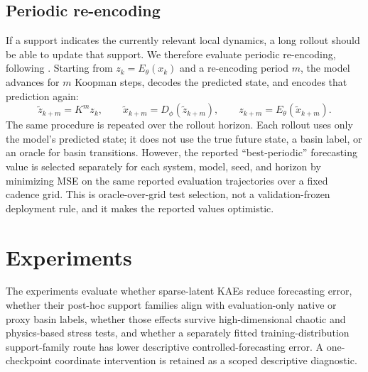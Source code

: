 \documentclass[11pt]{article}
\newcommand{\Enc}{E_\theta}
\newcommand{\Dec}{D_\phi}
\begin{document}
\subsection{Periodic re-encoding}
If a support indicates the currently relevant local dynamics, a long rollout should be able to update that support. We therefore evaluate periodic re-encoding, following \citet{fathi2024course}. Starting from $z_k=\Enc(x_k)$ and a re-encoding period $m$, the model advances for $m$ Koopman steps, decodes the predicted state, and encodes that prediction again:
\begin{equation}
  \tilde z_{k+m}=K^m z_k,\qquad
  \tilde x_{k+m}=\Dec(\tilde z_{k+m}),\qquad
  z_{k+m}=\Enc(\tilde x_{k+m}).
  \label{eq:reencode}
\end{equation}
The same procedure is repeated over the rollout horizon. Each rollout uses only the model's predicted state; it does not use the true future state, a basin label, or an oracle for basin transitions. However, the reported ``best-periodic'' forecasting value is selected separately for each system, model, seed, and horizon by minimizing MSE on the same reported evaluation trajectories over a fixed cadence grid. This is oracle-over-grid test selection, not a validation-frozen deployment rule, and it makes the reported values optimistic.

\section{Experiments}
\label{sec:experiments}
The experiments evaluate whether sparse-latent KAEs reduce forecasting error, whether their post-hoc support families align with evaluation-only native or proxy basin labels, whether those effects survive high-dimensional chaotic and physics-based stress tests, and whether a separately fitted training-distribution support-family route has lower descriptive controlled-forecasting error. A one-checkpoint coordinate intervention is retained as a scoped descriptive diagnostic.
\end{document}

